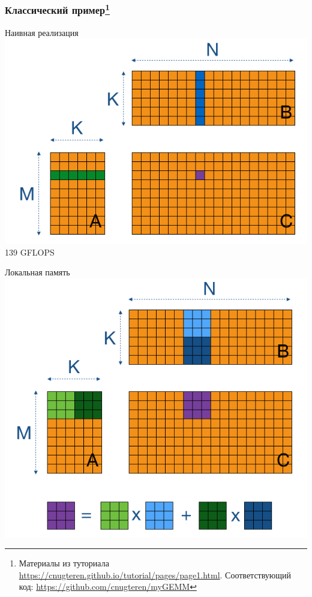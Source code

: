 \documentclass[xcolor=table,aspectratio=169]{beamer}
\begin{document}
\begin{frame}[fragile]
  \frametitle{Классический пример\footnote{Материалы из туториала \url{https://cnugteren.github.io/tutorial/pages/page1.html}. Соответствующий код: \url{https://github.com/cnugteren/myGEMM}}}
  \begin{minipage}[t][0.5\textheight]{0.32\textwidth}
    \begin{center}
      \vspace{-1cm}
      Наивная реализация
    \includegraphics[valign=t,width=\textwidth]{pictures/gemm1.png}
    \vfill
    139 GFLOPS
    \end{center}
  \end{minipage}
  \begin{minipage}[t][0.5\textheight]{0.32\textwidth}
    \begin{center}
      \vspace{-1cm}
      Локальная память
    \includegraphics[valign=t,width=\textwidth]{pictures/gemm2a.png}

\end{center}
\end{minipage}
\end{frame}
\end{document}
